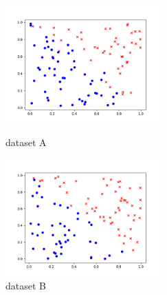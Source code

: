 \begin{answer}
    \begin{figure}[htbp]
        \centering
        \begin{minipage}[t]{0.48\textwidth}
            \centering
            \includegraphics[width=6cm]{../src/output/dataset1_a.png}
            \caption{dataset A}
        \end{minipage}
        \centering
        \begin{minipage}[t]{0.48\textwidth}
            \centering
            \includegraphics[width=6cm]{../src/output/dataset1_b.png}
            \caption{dataset B}
        \end{minipage}
    \end{figure}
\end{answer}
